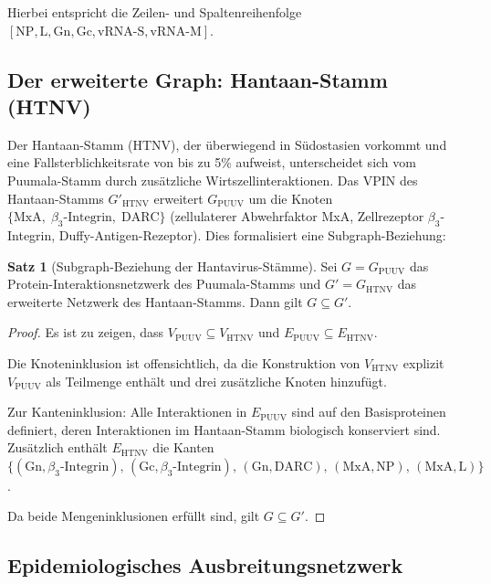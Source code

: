 ﻿\documentclass[a4paper,12pt]{article}
\theoremstyle{definition}
\newtheorem{satz}{Satz}
\begin{document}
Hierbei entspricht die Zeilen- und Spaltenreihenfolge
$[\mathrm{NP}, \mathrm{L}, \mathrm{Gn}, \mathrm{Gc}, \mathrm{vRNA\text{-}S},
\mathrm{vRNA\text{-}M}]$.

\subsection{Der erweiterte Graph: Hantaan-Stamm (HTNV)}

Der Hantaan-Stamm (HTNV), der \"uberwiegend in S\"udostasien vorkommt
und eine Fallsterblichkeitsrate von bis zu 5\% aufweist, unterscheidet
sich vom Puumala-Stamm durch zus\"atzliche Wirtszellinteraktionen.
Das VPIN des Hantaan-Stamms $G'_{\mathrm{HTNV}}$ erweitert $G_{\mathrm{PUUV}}$
um die Knoten $\{\mathrm{MxA},\; \beta_3\text{-Integrin},\; \mathrm{DARC}\}$
(zellulaterer Abwehrfaktor MxA, Zellrezeptor $\beta_3$-Integrin,
Duffy-Antigen-Rezeptor). Dies formalisiert eine Subgraph-Beziehung:

\begin{satz}[Subgraph-Beziehung der Hantavirus-St\"amme]
    \label{satz:subgraph_staemme}
    Sei $G = G_{\mathrm{PUUV}}$ das Protein-Interaktionsnetzwerk des
    Puumala-Stamms und $G' = G_{\mathrm{HTNV}}$ das erweiterte Netzwerk
    des Hantaan-Stamms. Dann gilt $G \subseteq G'$.
\end{satz}

\begin{proof}
    Es ist zu zeigen, dass $V_{\mathrm{PUUV}} \subseteq V_{\mathrm{HTNV}}$
    und $E_{\mathrm{PUUV}} \subseteq E_{\mathrm{HTNV}}$.

    Die Knoteninklusion ist offensichtlich, da die Konstruktion von
    $V_{\mathrm{HTNV}}$ explizit $V_{\mathrm{PUUV}}$ als Teilmenge enth\"alt
    und drei zus\"atzliche Knoten hinzuf\"ugt.

    Zur Kanteninklusion: Alle Interaktionen in $E_{\mathrm{PUUV}}$ sind
    auf den Basisproteinen definiert, deren Interaktionen im Hantaan-Stamm
    biologisch konserviert sind. Zus\"atzlich enth\"alt $E_{\mathrm{HTNV}}$
    die Kanten $\{(\mathrm{Gn}, \beta_3\text{-Integrin}),\, (\mathrm{Gc}, \beta_3\text{-Integrin}),\,
    (\mathrm{Gn}, \mathrm{DARC}),\, (\mathrm{MxA}, \mathrm{NP}),\, (\mathrm{MxA}, \mathrm{L})\}$.

    Da beide Mengeninklusionen erf\"ullt sind, gilt $G \subseteq G'$. \qedhere
\end{proof}

\subsection{Epidemiologisches Ausbreitungsnetzwerk}
\end{document}
